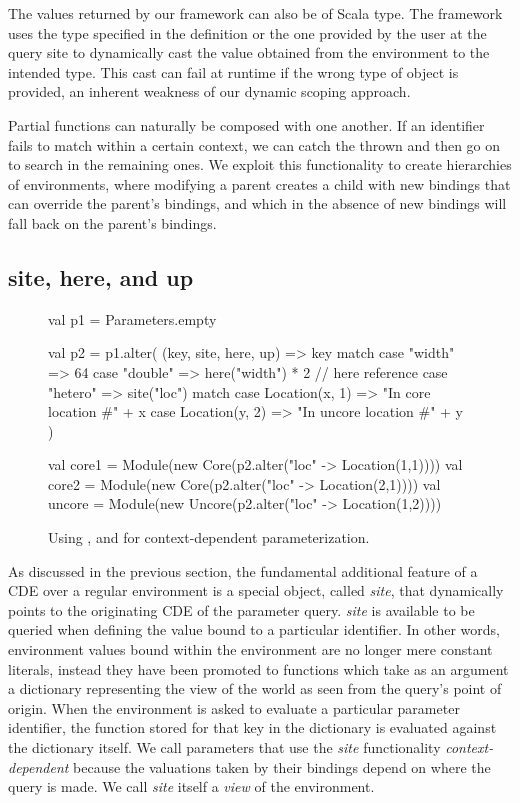 The values returned by our framework can also be of  Scala type.
The framework uses the type specified in the  definition 
or the one provided by the user at the query site
to dynamically cast the value obtained from the environment to the intended type.
This cast can fail at runtime if the wrong type of object is provided, an inherent weakness of our dynamic scoping approach.

Partial functions can naturally be composed with one another. If an identifier fails to match
within a certain context, we can catch the  thrown and then go on to search
in the remaining ones.
We exploit this functionality to create hierarchies of environments,
where modifying a parent creates a child with new bindings that can override the parent's bindings,
and which in the absence of new bindings will fall back on the parent's bindings.

\subsection{site, here, and up}

\begin{figure}
\centering
\begin{scala}
val p1 = Parameters.empty

val p2 = p1.alter(
  (key, site, here, up) => key match { 
    case "width" => 64
    case "double" => here("width") * 2  // here reference
    case "hetero" => site("loc") match {
      case Location(x, 1) => "In core location #" + x
      case Location(y, 2) => "In uncore location #" + y
    }
  }
) 

val core1 = Module(new Core(p2.alter("loc" -> Location(1,1))))
val core2 = Module(new Core(p2.alter("loc" -> Location(2,1))))
val uncore = Module(new Uncore(p2.alter("loc" -> Location(1,2))))

\end{scala} 
\caption{Using ,  and   for context-dependent parameterization.}
\label{fig:site}
\end{figure}

As discussed in the previous section, the fundamental additional feature of a CDE over a regular environment is a special object,
called \emph{site}, that dynamically points to the originating CDE of the parameter query.
\emph{site} is available to be queried when defining the value bound to a particular identifier.
In other words, environment values bound within the environment are no longer mere constant literals, instead
they have been promoted to functions which take as an argument a dictionary representing the view of the world as seen from the query's point of origin.
When the environment is asked to evaluate a particular parameter identifier, the function stored for that key in the dictionary is evaluated against the dictionary itself.
We call parameters that use the \emph{site} functionality {\em context-dependent} because the valuations taken by their bindings depend on where the query is made.
We call \emph{site} itself a \emph{view} of the environment.

